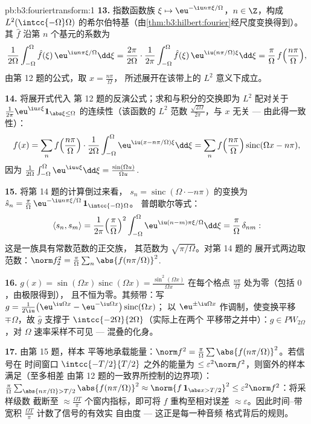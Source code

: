 \begin{solution}{pb:b3:fouriertransform:1}
\textbf{13.} 指数函数族 $\xi \mapsto \eu^{-\iu
n\pi\xi/\Omega}$，$n \in \Z$，构成
$L^2(\intcc{-\Omega}\Omega)$
的希尔伯特基（由\cref{thm:b3:hilbert:fourier}经尺度变换得到）。其
$\hat f$ 沿第 $n$ 个基元的系数为
\[
\frac1{2\Omega}\int_{-\Omega}^\Omega\hat f(\xi)\,
\eu^{\iu n\pi\xi/\Omega}\dd\xi
= \frac{2\pi}{2\Omega}\cdot
\frac1{2\pi}\int_{-\Omega}^{\Omega}\hat f(\xi)\,
\eu^{\iu(n\pi/\Omega)\xi}\dd\xi
= \frac\pi\Omega\,f\Bigl(\frac{n\pi}\Omega\Bigr),
\]
由第 12 题的公式，取 $x = \frac{n\pi}\Omega$，
所述展开在该带上的 $L^2$ 意义下成立。

\textbf{14.} 将展开式代入
第 12 题的反演公式；求和与积分的交换即为
$L^2$ 配对关于 $\frac1{2\pi}
\eu^{\iu x\xi}\mathbf 1_{\abs\xi\leq\Omega}$ 的连续性（该函数的 $L^2$
范数 $\frac{\sqrt{2\Omega}}{2\pi}$，与 $x$ 无关 ---
由此得一致性）：
\[
f(x) = \sum_nf\Bigl(\frac{n\pi}\Omega\Bigr)\cdot
\frac1{2\Omega}\int_{-\Omega}^\Omega
\eu^{\iu(x - n\pi/\Omega)\xi}\dd\xi
= \sum_nf\Bigl(\frac{n\pi}\Omega\Bigr)
\operatorname{sinc}(\Omega x - n\pi),
\]
因为 $\frac1{2\Omega}\int_{-\Omega}^\Omega\eu^{\iu
u\xi}\dd\xi = \frac{\sin(\Omega u)}{\Omega u}$.

\textbf{15.} 将第 14 题的计算倒过来看，
$s_n = \operatorname{sinc}(\Omega\cdot -
n\pi)$ 的变换为 $\hat s_n = \frac\pi\Omega\,\eu^{-\iu
n\pi\xi/\Omega}\,\mathbf 1_{\intcc{-\Omega}\Omega}$。
普朗歇尔等式：
\[
\langle s_n, s_m\rangle = \frac1{2\pi}
\Bigl(\frac\pi\Omega\Bigr)^2\int_{-\Omega}^\Omega
\eu^{\iu(n-m)\pi\xi/\Omega}\dd\xi =
\frac\pi\Omega\,\delta_{nm} :
\]
这是一族具有常数范数的正交族，
其范数为 $\sqrt{\pi/\Omega}$。对第 14 题的
展开式两边取范数：$\norm f_2^2 =
\frac\pi\Omega\sum_n\abs{f(n\pi/\Omega)}^2$.

\textbf{16.} $g(x) = \sin(\Omega x)\operatorname{sinc}
(\Omega x) = \frac{\sin^2(\Omega x)}{\Omega x}$ 在每个格点
$\frac{n\pi}\Omega$ 处为零（包括 $0$，由极限得到），
且不恒为零。其频带：写 $g =
\frac1{2\iu}\bigl(\eu^{\iu\Omega x} - \eu^{-\iu\Omega
x}\bigr)\operatorname{sinc}(\Omega x)$；
以 $\eu^{\pm\iu\Omega x}$ 作调制，使变换平移
$\mp\Omega$，故 $\hat g$ 支撑于
$\intcc{-2\Omega}{2\Omega}$（实际上在两个
平移带之并中）：$g \in PW_{2\Omega}$，对
$\Omega$ 速率采样不可见 --- 混叠的化身。

\textbf{17.} 由第 15 题，样本
平等地承载能量：$\norm f^2 = \frac\pi\Omega\sum
\abs{f(n\pi/\Omega)}^2$。若信号在
时间窗口 $\intcc{-T/2}{T/2}$ 之外的能量为 $\leq \varepsilon^2\norm
f^2$，则窗外的样本满足（至多相差
由第 12 题的一致界所控制的边界项）：
$\frac\pi\Omega\sum_{\abs{n\pi/\Omega} > T/2}
\abs{f(n\pi/\Omega)}^2 \approx \norm{f\,\mathbf 1_{\abs x >
T/2}}^2 \leq \varepsilon^2\norm f^2$：将采样级数
截断至 $\approx \frac{\Omega T}\pi$
个窗内指标，即可将 $f$ 重构至相对误差
$\approx\varepsilon$。因此时间--带宽积
$\frac{\Omega T}{\pi}$ 计数了信号的有效实
自由度 --- 这正是每一种音频
格式背后的规则。


\end{solution}
